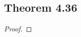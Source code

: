 \documentclass[../../main.tex]{subfiles}
\begin{document}
\subsection{Theorem 4.36}
\begin{wts}

\end{wts}
\begin{proof}

\end{proof}
\end{document}
